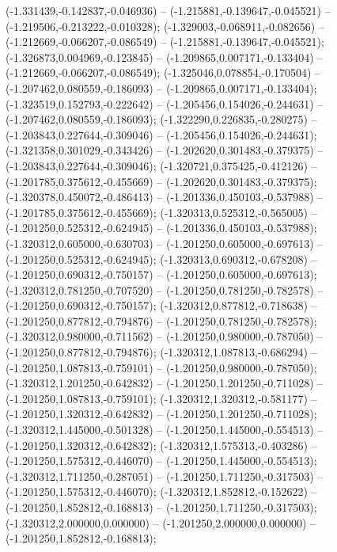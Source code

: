 (-1.331439,-0.142837,-0.046936) -- (-1.215881,-0.139647,-0.045521) -- (-1.219506,-0.213222,-0.010328);
 (-1.329003,-0.068911,-0.082656) -- (-1.212669,-0.066207,-0.086549) -- (-1.215881,-0.139647,-0.045521);
 (-1.326873,0.004969,-0.123845) -- (-1.209865,0.007171,-0.133404) -- (-1.212669,-0.066207,-0.086549);
 (-1.325046,0.078854,-0.170504) -- (-1.207462,0.080559,-0.186093) -- (-1.209865,0.007171,-0.133404);
 (-1.323519,0.152793,-0.222642) -- (-1.205456,0.154026,-0.244631) -- (-1.207462,0.080559,-0.186093);
 (-1.322290,0.226835,-0.280275) -- (-1.203843,0.227644,-0.309046) -- (-1.205456,0.154026,-0.244631);
 (-1.321358,0.301029,-0.343426) -- (-1.202620,0.301483,-0.379375) -- (-1.203843,0.227644,-0.309046);
 (-1.320721,0.375425,-0.412126) -- (-1.201785,0.375612,-0.455669) -- (-1.202620,0.301483,-0.379375);
 (-1.320378,0.450072,-0.486413) -- (-1.201336,0.450103,-0.537988) -- (-1.201785,0.375612,-0.455669);
 (-1.320313,0.525312,-0.565005) -- (-1.201250,0.525312,-0.624945) -- (-1.201336,0.450103,-0.537988);
 (-1.320312,0.605000,-0.630703) -- (-1.201250,0.605000,-0.697613) -- (-1.201250,0.525312,-0.624945);
 (-1.320313,0.690312,-0.678208) -- (-1.201250,0.690312,-0.750157) -- (-1.201250,0.605000,-0.697613);
 (-1.320312,0.781250,-0.707520) -- (-1.201250,0.781250,-0.782578) -- (-1.201250,0.690312,-0.750157);
 (-1.320312,0.877812,-0.718638) -- (-1.201250,0.877812,-0.794876) -- (-1.201250,0.781250,-0.782578);
 (-1.320312,0.980000,-0.711562) -- (-1.201250,0.980000,-0.787050) -- (-1.201250,0.877812,-0.794876);
 (-1.320312,1.087813,-0.686294) -- (-1.201250,1.087813,-0.759101) -- (-1.201250,0.980000,-0.787050);
 (-1.320312,1.201250,-0.642832) -- (-1.201250,1.201250,-0.711028) -- (-1.201250,1.087813,-0.759101);
 (-1.320312,1.320312,-0.581177) -- (-1.201250,1.320312,-0.642832) -- (-1.201250,1.201250,-0.711028);
 (-1.320312,1.445000,-0.501328) -- (-1.201250,1.445000,-0.554513) -- (-1.201250,1.320312,-0.642832);
 (-1.320312,1.575313,-0.403286) -- (-1.201250,1.575312,-0.446070) -- (-1.201250,1.445000,-0.554513);
 (-1.320312,1.711250,-0.287051) -- (-1.201250,1.711250,-0.317503) -- (-1.201250,1.575312,-0.446070);
 (-1.320312,1.852812,-0.152622) -- (-1.201250,1.852812,-0.168813) -- (-1.201250,1.711250,-0.317503);
 (-1.320312,2.000000,0.000000) -- (-1.201250,2.000000,0.000000) -- (-1.201250,1.852812,-0.168813);
